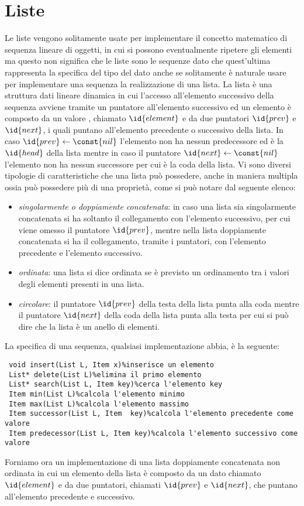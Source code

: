 \section{Liste}
Le liste vengono solitamente usate per implementare il concetto matematico di sequenza lineare di oggetti, in cui si possono eventualmente ripetere gli elementi
ma questo non significa che le liste sono le sequenze dato che quest'ultima rappresenta la specifica del tipo del dato anche se solitamente è naturale usare per 
implementare una sequenza la realizzazione di una lista.\newline
La lista è una struttura dati lineare dinamica in cui l'accesso all'elemento successivo della sequenza avviene tramite un puntatore all'elemento successivo
ed un elemento è composto da un valore , chiamato $\id{element}$ e da due puntatori $\id{prev}$ e $\id{next}$,
i quali puntano all'elemento precedente o successivo della lista.\newline
In caso $\id{prev} \gets \const{nil}$ l'elemento non ha nessun predecessore ed è la $\id{head}$ della lista mentre in caso il puntatore $\id{next} \gets \const{nil}$
l'elemento non ha nessun successore per cui è la coda della lista.
Vi sono diversi tipologie di caratteristiche che una lista può possedere, anche in maniera multipla ossia può possedere più di una proprietà, come si può notare dal seguente elenco:
\begin{itemize}
    \item \emph{singolarmente o doppiamente concatenata}: in caso una lista sia singolarmente
        concatenata si ha soltanto il collegamento con l'elemento successivo, per
        cui viene omesso il puntatore $\id{prev}$, mentre nella lista doppiamente concatenata
         si ha il collegamento, tramite i puntatori, con l'elemento precedente e l'elemento successivo.
     \item \emph{ordinata}: una lista si dice ordinata se è previsto un ordinamento tra i valori
        degli elementi presenti in una lista.
    \item \emph{circolare}: il puntatore $\id{prev}$ della testa della lista punta alla coda
        mentre il puntatore $\id{next}$ della coda della lista punta alla testa
       per cui si può dire che la lista è un anello di elementi.
\end{itemize}
La specifica di una sequenza, qualsiasi implementazione abbia, è la seguente:
\begin{verbatim}
 void insert(List L, Item x)%inserisce un elemento 
 List* delete(List L)%elimina il primo elemento
 List* search(List L, Item key)%cerca l'elemento key
 Item min(List L)%calcola l'elemento minimo
 Item max(List L)%calcola l'elemento massimo 
 Item successor(List L, Item  key)%calcola l'elemento precedente come valore
 Item predecessor(List L, Item key)%calcola l'elemento successivo come valore 
\end{verbatim}
Forniamo ora un implementazione di una lista doppiamente concatenata non ordinata
in cui un elemento della lista è composto da un dato chiamato $\id{element}$ e da due
puntatori, chiamati $\id{prev}$ e $\id{next}$, che puntano all'elemento precedente e successivo.

